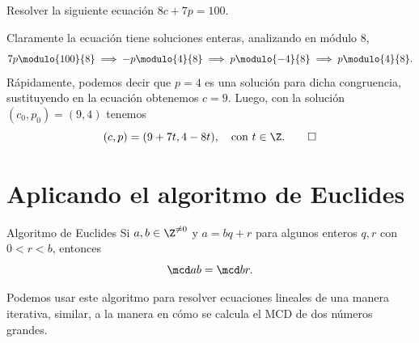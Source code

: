 \documentclass[12pt]{article}
\begin{document}
    \begin{example}
        Resolver la siguiente ecuación $8c+7p=100$.
    \end{example}
    \begin{solution}
        Claramente la ecuación tiene soluciones enteras, analizando en módulo 8,
        \[
            7p \modulo{100}{8} \implies -p \modulo{4}{8} \implies p \modulo{-4}{8} \implies p \modulo{4}{8}.
        \]
        Rápidamente, podemos decir que $p = 4$ es una solución para dicha congruencia, sustituyendo en la ecuación obtenemos $c = 9$.
        Luego, con la solución $(c_0, p_0) = (9, 4)$ tenemos
        \[
            (c,p) = (9 + 7t, 4 - 8t),\quad \text{con}\ t\in \Z.\qedhere
        \]
    \end{solution}



    \section{Aplicando el algoritmo de Euclides}

    \begin{definition.box}{Algoritmo de Euclides}{}
        Si $a, b \in \Z^{\neq 0}$ y $a = bq + r$ para algunos enteros $q,r$ con $0 < r < b$, entonces
        \[
            \mcd a b = \mcd b r.
        \]
    \end{definition.box}

    Podemos usar este algoritmo para resolver ecuaciones lineales de una manera iterativa, similar, a la manera en cómo
    se calcula el MCD de dos números grandes.
\end{document}
